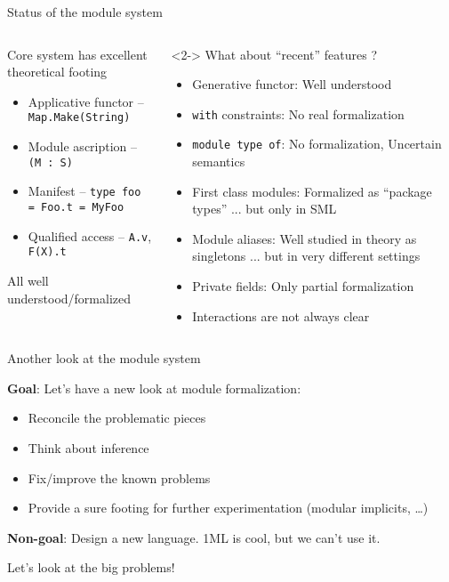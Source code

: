 \documentclass[aspectratio=169,dvipsnames,svgnames,10pt]{beamer}
\newcommand\Y{{\color{Green}{\ding{52}}}\xspace}
\newcommand\N{{\color{Red}{\ding{56}}}\xspace}
\begin{document}
\begin{frame}[fragile]{Status of the module system}

  \begin{columns}
    \begin{column}{0.5\textwidth}
  Core system has excellent theoretical footing
  \begin{itemize}
  \item Applicative functor -- \texttt{Map.Make(String)}
  \item Module ascription -- \texttt{(M : S)}
  \item Manifest -- \texttt{type foo = Foo.t = MyFoo}
  \item Qualified access -- \texttt{A.v}, \texttt{F(X).t}
  \end{itemize}
  \Y All well understood/formalized
\end{column}
\begin{column}{0.5\textwidth}
  \begin{onlyenv}<2->
  What about ``recent'' features ?
  \begin{itemize}
  \item Generative functor:
    Well understood \Y
  \item \texttt{with} constraints: 
    No real formalization \N
  \item \texttt{module type of}:
    No formalization, Uncertain semantics \N
  \item First class modules:
    Formalized as ``package types'' \Y ...
    but only in SML \N
  \item Module aliases:
    Well studied in theory as singletons \Y ...
    but in very different settings \N
  \item Private fields:
    Only partial formalization
  \item<3>
    Interactions are not always clear
  \end{itemize}
\end{onlyenv}

\end{column}
\end{columns}
\end{frame}



\begin{frame}{Another look at the module system}

  \textbf{Goal}: Let's have a new look at module formalization:
  \begin{itemize}
  \item Reconcile the problematic pieces
  \item Think about inference
  \item Fix/improve the known problems
  \item Provide a sure footing for further experimentation (modular implicits, \dots)
  \end{itemize}

  \pause
  \textbf{Non-goal}: Design a new language. 1ML is cool, but we can't use it.

  \pause
  Let's look at the big problems!
\end{frame}
\end{document}
